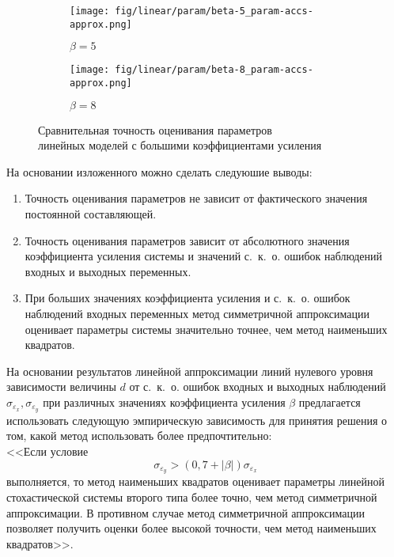 \begin{figure}[p]
  \begin{subfigure}[b]{\linewidth}
    \centering
    \texttt{[image: fig/linear/param/beta-5\_param-accs-approx.png]}
    \caption{\( \beta = 5 \)}
  \end{subfigure}

  \vspace{2\baselineskip}
  \begin{subfigure}[b]{\linewidth}
    \centering
    \texttt{[image: fig/linear/param/beta-8\_param-accs-approx.png]}
    \caption{\( \beta = 8 \)}
  \end{subfigure}

  \vspace{\baselineskip}
  \caption{%
    Сравнительная точность оценивания параметров \\
    линейных моделей с большими коэффициентами усиления
  }\label{fig:comparison_linear_params_beta-big}
\end{figure}

На основании изложенного можно сделать следуюшие выводы:
\begin{enumerate}
\item Точность оценивания параметров не зависит от фактического значения
  постоянной составляющей.
\item Точность оценивания параметров зависит от абсолютного значения
  коэффициента усиления системы и значений с.~к.~о. ошибок наблюдений
  входных и выходных переменных.
\item При больших значениях коэффициента усиления и с.~к.~о. ошибок наблюдений
  входных переменных метод симметричной аппроксимации оценивает
  параметры системы значительно точнее, чем метод наименьших квадратов.
\end{enumerate}

На основании результатов линейной аппроксимации линий нулевого уровня
зависимости величины \( d \) от с.~к.~о. ошибок входных и выходных наблюдений
\( \sigma_{\varepsilon_x}, \sigma_{\varepsilon_y} \)
при различных значениях коэффициента усиления \( \beta \) предлагается использовать
следующую эмпирическую зависимость для принятия решения о том, какой метод
использовать более предпочтительно: \\
<<Если условие
\begin{equation}
  \sigma_{\varepsilon_y} > (0{,}7 + |\beta|) \sigma_{\varepsilon_x}
  \label{eq:linear_rule_param}
\end{equation}
выполняется, то метод наименьших квадратов оценивает параметры линейной
стохастической системы второго типа более точно, чем метод симметричной аппроксимации.
В противном случае метод симметричной аппроксимации позволяет получить
оценки более высокой точности, чем метод наименьших квадратов>>.

